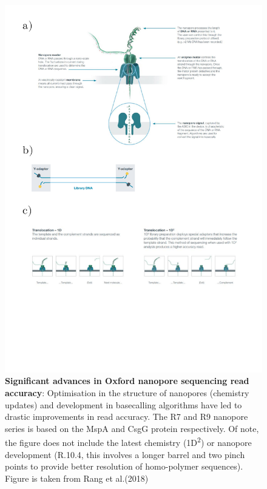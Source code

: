 \begin{figure}[h]
	\centering
	\includegraphics[page=2,trim={0 19cm 0 0 },clip, scale = 0.8]{Figures/ProjectDevelopment_FiguresONT}
	\captionsetup{width=0.95\textwidth}
	\caption[Significant advances in Oxford nanopore sequencing read accuracy]%
	{\textbf{Significant advances in Oxford nanopore sequencing read accuracy}: Optimisation in the structure of nanopores (chemistry updates) and development in basecalling algorithms have led to drastic improvements in read accuracy. The R7 and R9 nanopore series is based on the MspA and CsgG protein respectively. Of note, the figure does not include the latest chemistry (1D\textsuperscript{2}) or nanopore development (R.10.4, this involves a longer barrel and two pinch points to provide better resolution of homo-polymer sequences). Figure is taken from Rang et al.(2018)\cite{Rang2018}}
	\label{fig:ONT_advances}
\end{figure}

